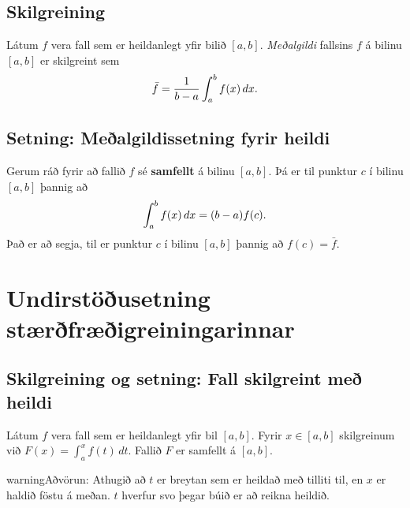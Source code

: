 \documentclass[a4paper,10pt,icelandic]{sphinxmanual}
\begin{document}

\subsection{Skilgreining}
\label{kafli06:id7}\label{kafli06:index-3}
Látum \(f\) vera fall sem er heildanlegt yfir bilið \([a, b]\).
\textit{Meðalgildi} fallsins \(f\) á bilinu \([a, b]\) er skilgreint
sem
\begin{gather}
\begin{split}\bar{f}=\frac{1}{b-a}\int_{a}^b f(x)\,dx.\end{split}\notag
\end{gather}

\subsection{Setning: Meðalgildissetning fyrir heildi}
\label{kafli06:index-4}\label{kafli06:setning-mealgildissetning-fyrir-heildi}
Gerum ráð fyrir að fallið \(f\) sé \textbf{samfellt} á bilinu
\([a, b]\). Þá er til punktur \(c\) í bilinu \([a, b]\)
þannig að
\begin{gather}
\begin{split}\int_a^b f(x)\,dx=(b-a)f(c).\end{split}\notag
\end{gather}
Það er að segja, til er punktur \(c\) í bilinu \([a, b]\) þannig
að \(f(c)=\bar{f}\).


\section{Undirstöðusetning stærðfræðigreiningarinnar}
\label{kafli06:undirstousetning-staerfraeigreiningarinnar}

\subsection{Skilgreining og setning: Fall skilgreint með heildi}
\label{kafli06:skilgreining-og-setning-fall-skilgreint-me-heildi}\label{kafli06:index-5}
Látum \(f\) vera fall sem er heildanlegt yfir bil \([a, b]\).
Fyrir \(x\in[a, b]\) skilgreinum við \(F(x)=\int_a^x f(t)\,dt\).
Fallið \(F\) er samfellt á \([a, b]\).

\begin{notice}{warning}{Aðvörun:}
Athugið að \(t\) er breytan sem er heildað með tilliti til, en
\(x\) er haldið föstu á meðan. \(t\) hverfur svo þegar búið er
að reikna heildið.
\end{notice}
\end{document}

